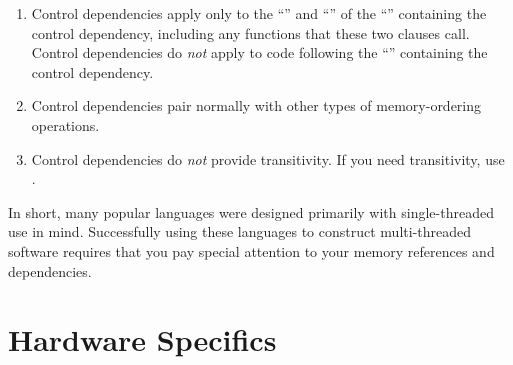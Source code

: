 \begin{enumerate}
\item	Control dependencies apply only to the ``'' and
	``'' of the ``'' containing the control
	dependency, including any functions that these two clauses call.
	Control dependencies do \emph{not} apply to code following the
	``'' containing the control dependency.

\item	Control dependencies pair normally with other types of
	memory-ordering operations.

\item	Control dependencies do \emph{not} provide transitivity.
	If you need transitivity, use .
\end{enumerate}

In short, many popular languages were designed primarily with
single-threaded use in mind.
Successfully using these languages to construct multi-threaded software
requires that you pay special attention to your memory references and
dependencies.

\section{Hardware Specifics}
\label{sec:memorder:Hardware Specifics}

